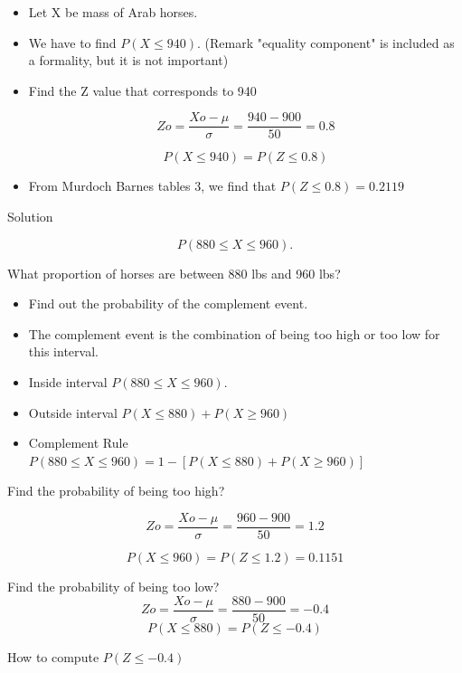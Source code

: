 ﻿\documentclass[]{report}
\begin{document}
\begin{itemize}
	\item Let X be mass of Arab horses.
	
	\item We have to find $P(X\leq940)$.            (Remark "equality component" is included as a formality, but it is not important)
	
	
	\item	Find the Z value that corresponds to 940 
	
	\[Zo=\frac{Xo-\mu}{\sigma}= \frac{940 -900}{50}= 0.8\]
	
	\[P(X \leq 940) = P(Z \leq 0.8) \]
	
	
	\item		From Murdoch Barnes tables 3, we find that $P(Z \leq 0.8) = 0.2119$
\end{itemize}





Solution 

\[P ( 880 \leq X \leq 960).\]


What proportion of horses are between 880 lbs and 960 lbs?
\begin{itemize}
	\item Find out the probability of the complement event.
	\item The complement event is the combination of being too high  or too low for this interval.
	
	\item Inside interval $P ( 880 \leq X \leq 960).$
	
	\item Outside interval $P (X \leq 880) + P(X \geq 960)$
	
	\item Complement Rule $P ( 880\leq X \leq 960)  = 1 - [P (X\leq 880) +P(X\geq 960)]$
	
\end{itemize}



Find the probability of being too high?

\[Zo=\frac{Xo-\mu}{\sigma}= \frac{960 -900}{50}= 1.2\]

\[P(X \leq 960) = P(Z \leq 1.2) = 0.1151\]


Find the probability of being too low?
\[Zo= \frac{Xo-\mu}{\sigma}= \frac{880 -900}{50}= -0.4 \]
\[P(X \leq 880) = P(Z \leq -0.4)  \]

How to compute $P(Z \leq -0.4)$
\end{document}
